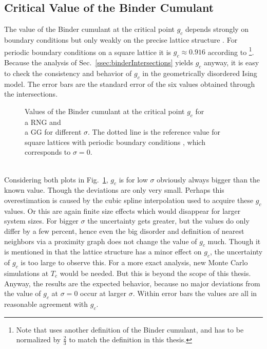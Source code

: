 \subsection{Critical Value of the Binder Cumulant}
    The value of the Binder cumulant at the critical point \(g_c\)
    depends strongly on boundary conditions but only weakly on the precise lattice
    structure \cite{BinderValue}. For periodic boundary conditions on a
    square lattice it is \(g_c \approx 0.916\) according to \cite{BinderValue}
        \footnote{Note that \cite{BinderValue} uses another definition of
            the Binder cumulant, and has to be normalized by \(\frac{2}{3}\)
            to match the definition in this thesis.}.
    Because the analysis of Sec.\ \ref{ssec:binderIntersections}
    yields \(g_c\) anyway, it is easy to check the consistency and
    behavior of \(g_c\) in the geometrically disordered Ising model.
    The error bars are the standard error of the six values obtained
    through the intersections.\\
    \begin{figure}[htbp]
        \centering
        \caption[Values of the Binder Cumulant at the Critical Point $g_c$]
        {
            Values of the Binder cumulant at the critical point \(g_c\)
            for\\
             a RNG and\\
             a GG for different \(\sigma\).
            The dotted line is the reference value for square lattices
            with periodic boundary conditions \cite{BinderValue}, which
            corresponds to \(\sigma = 0\).
        }
        \label{fig:TcG}
    \end{figure}\\
    Considering both plots in Fig.\ \ref{fig:TcG}, \(g_c\) is for low
    \(\sigma\) obviously always bigger than the known value. Though the
    deviations are only very small. Perhaps this overestimation is caused
    by the cubic spline interpolation used to acquire these \(g_c\) values.
    Or this are again finite size effects which would disappear for
    larger system sizes.
    For bigger \(\sigma\) the uncertainty gets greater, but the values
    do only differ by a few percent, hence even the big disorder and
    definition of nearest neighbors via a proximity graph does not change
    the value of \(g_c\) much. Though it is mentioned in \cite{BinderValue} that the
    lattice structure has a minor effect on \(g_c\), the uncertainty of
    \(g_c\) is too large to observe this. For a more exact analysis, new
    Monte Carlo simulations at \(T_c\) would be needed. But this is
    beyond the scope of this thesis. Anyway, the results are the expected
    behavior, because no major deviations from the value of \(g_c\) at
    \(\sigma = 0\) occur at larger \(\sigma\). Within error bars the
    values are all in reasonable agreement with \(g_c\).
